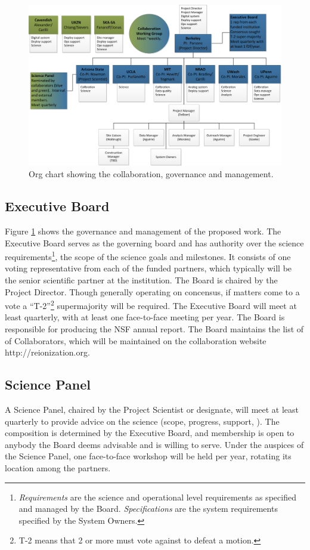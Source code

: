 \documentclass[preprint]{aastex}
\begin{document}
\begin{figure}[h]
\centering
\includegraphics[width=\textwidth]{plots/org.png}
\caption{Org chart showing the collaboration, governance and management.}
\label{fig:org}
\end{figure}

\subsection{Executive Board}
Figure \ref{fig:org} shows the governance and management of the proposed work. The
Executive Board serves as the governing board and has authority over the science
requirements\footnote{{\em Requirements} are the science and operational level
requirements as specified and managed by the Board. {\em Specifications} are the
system requirements specified by the System Owners.}, the scope of the science goals
and milestones. It consists of one voting representative from each of the funded
partners, which typically will be the senior scientific partner at the institution.
The Board is chaired by the Project Director. Though generally operating on
concensus, if matters come to a vote a ``T-2''\footnote{T-2 means that 2 or more must
vote against to defeat a motion.} supermajority will be required. The Executive Board
will meet at least quarterly, with at least one face-to-face meeting per year. The
Board is responsible for producing the NSF annual report. The Board maintains the
list of of Collaborators, which will be maintained on the collaboration website
http://reionization.org.

\subsection{Science Panel}
A Science Panel, chaired by the Project Scientist or designate, will meet at least
quarterly to provide advice on the science (scope, progress, support, ). The
composition is determined by the Executive Board, and membership is open to anybody
the Board deems advisable and is willing to serve. Under the auspices of the Science
Panel, one face-to-face workshop will be held per year, rotating its location among
the partners.
\end{document}

